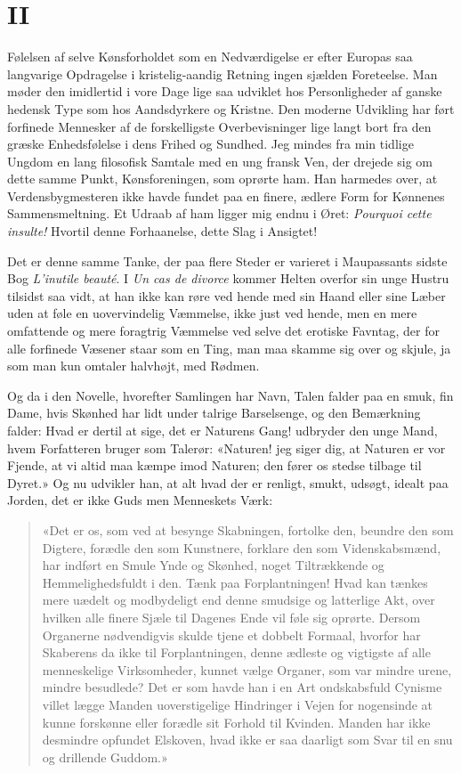 \documentclass[12pt,a4paper]{article}
\begin{document}
\section*{II}

Følelsen af selve Kønsforholdet som en Nedværdigelse er efter Europas saa
langvarige Opdragelse i kristelig-aandig Retning ingen sjælden Foreteelse.
Man møder den imidlertid i vore Dage lige saa udviklet hos Personligheder
af ganske hedensk Type som hos Aandsdyrkere og Kristne. Den moderne
Udvikling har ført forfinede Mennesker af de forskelligste Overbevisninger
lige langt bort fra den græske Enhedsfølelse i dens Frihed og Sundhed.
Jeg mindes fra min tidlige Ungdom en lang filosofisk Samtale med en ung
fransk Ven, der drejede sig om dette samme Punkt, Kønsforeningen, som
oprørte ham. Han harmedes over, at Verdensbygmesteren ikke havde fundet
paa en finere, ædlere Form for Kønnenes Sammensmeltning. Et Udraab af ham
ligger mig endnu i Øret: \textit{Pourquoi cette insulte!} Hvortil denne
Forhaanelse, dette Slag i Ansigtet!

Det er denne samme Tanke, der paa flere Steder er varieret i Maupassants
sidste Bog \textit{L'inutile beauté}. I \textit{Un cas de divorce} kommer
Helten overfor sin unge Hustru tilsidst saa vidt, at han ikke kan røre
ved hende med sin Haand eller sine Læber uden at føle en uovervindelig
Væmmelse, ikke just ved hende, men en mere omfattende og mere foragtrig
Væmmelse ved selve det erotiske Favntag, der for alle forfinede Væsener
staar som en Ting, man maa skamme sig over og skjule, ja som man kun
omtaler halvhøjt, med Rødmen.

Og da i den Novelle, hvorefter Samlingen har Navn, Talen falder paa en
smuk, fin Dame, hvis Skønhed har lidt under talrige Barselsenge, og den
Bemærkning falder: Hvad er dertil at sige, det er Naturens Gang! udbryder
den unge Mand, hvem Forfatteren bruger som Talerør: «Naturen! jeg siger
dig, at Naturen er vor Fjende, at vi altid maa kæmpe imod Naturen; den
fører os stedse tilbage til Dyret.» Og nu udvikler han, at alt hvad der
er renligt, smukt, udsøgt, idealt paa Jorden, det er ikke Guds men
Menneskets Værk:

\begin{quote}
«Det er os, som ved at besynge Skabningen, fortolke den, beundre den som
Digtere, forædle den som Kunstnere, forklare den som Videnskabsmænd, har
indført en Smule Ynde og Skønhed, noget Tiltrækkende og
Hemmelighedsfuldt i den. Tænk paa Forplantningen! Hvad kan tænkes mere
uædelt og modbydeligt end denne smudsige og latterlige Akt, over hvilken
alle finere Sjæle til Dagenes Ende vil føle sig oprørte. Dersom Organerne
nødvendigvis skulde tjene et dobbelt Formaal, hvorfor har Skaberens da
ikke til Forplantningen, denne ædleste og vigtigste af alle menneskelige
Virksomheder, kunnet vælge Organer, som var mindre urene, mindre
besudlede? Det er som havde han i en Art ondskabsfuld Cynisme villet
lægge Manden uoverstigelige Hindringer i Vejen for nogensinde at kunne
forskønne eller forædle sit Forhold til Kvinden. Manden har ikke desmindre
opfundet Elskoven, hvad ikke er saa daarligt som Svar til en snu og
drillende Guddom.»
\end{quote}
\end{document}
